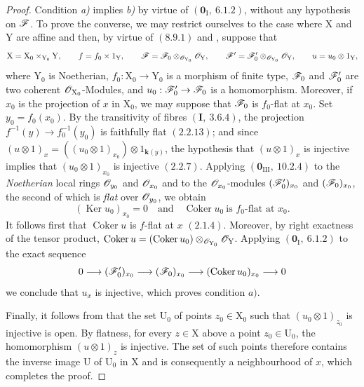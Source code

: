 \begin{proof}
Condition \emph{a)} implies \emph{b)} by virtue of $(\mathbf{0}_\mathrm{I},~6.1.2)$, without any hypothesis on $\mathscr{F}$. To prove the converse, we may restrict ourselves to the case where $\mathrm{X}$ and $\mathrm{Y}$ are affine and then, by virtue of $(8.9.1)$ and , suppose that
\[
  \mathrm{X}=\mathrm{X}_0\times_{\mathrm{Y}_0}\mathrm{Y},\qquad
  f=f_0\times 1_\mathrm{Y},\qquad
  \mathscr{F}=\mathscr{F}_0\otimes_{\mathscr{O}_{\mathrm{Y}_0}}\mathscr{O}_\mathrm{Y},\qquad
  \mathscr{F}'=\mathscr{F}'_0\otimes_{\mathscr{O}_{\mathrm{Y}_0}}\mathscr{O}_\mathrm{Y},\qquad
  u=u_0\otimes 1_\mathrm{Y},
\]
where $\mathrm{Y}_0$ is Noetherian, $f_0:\mathrm{X}_0\to\mathrm{Y}_0$ is a morphism of finite type, $\mathscr{F}_0$ and $\mathscr{F}'_0$ are two coherent $\mathscr{O}_{\mathrm{X}_0}$-Modules, and $u_0:\mathscr{F}'_0\to\mathscr{F}_0$ is a homomorphism. Moreover, if $x_0$ is the projection of $x$ in $\mathrm{X}_0$, we may suppose that $\mathscr{F}_0$ is $f_0$-flat at $x_0$. Set $y_0=f_0(x_0)$. By the transitivity of fibres $(\mathbf{I},~3.6.4)$, the projection $f^{-1}(y)\to f_0^{-1}(y_0)$ is faithfully flat $(2.2.13)$; and since $(u\otimes 1)_x=((u_0\otimes 1)_{x_0})\otimes 1_{\boldsymbol{k}(y)}$,
the hypothesis that $(u\otimes 1)_x$ is injective implies that $(u_0\otimes 1)_{x_0}$ is injective $(2.2.7)$. Applying $(\mathbf{0}_{\mathrm{III}},~10.2.4)$ to the \emph{Noetherian} local rings $\mathscr{O}_{y_0}$ and $\mathscr{O}_{x_0}$ and to the $\mathscr{O}_{x_0}$-modules $(\mathscr{F}'_0)_{x_0}$ and $(\mathscr{F}_0)_{x_0}$, the second of which is \emph{flat} over $\mathscr{O}_{y_0}$, we obtain
\[
  (\operatorname{Ker}u_0)_{x_0}=0
  \quad\text{and}\quad
  \operatorname{Coker}u_0\ \text{is $f_0$-flat at }x_0.
\]
It follows first that $\operatorname{Coker}u$ is $f$-flat at $x$ $(2.1.4)$. Moreover, by right exactness of the tensor product, $\operatorname{Coker}u=(\operatorname{Coker}u_0)
\otimes_{\mathscr{O}_{\mathrm{Y}_0}}\mathscr{O}_\mathrm{Y}$.
Applying $(\mathbf{0}_\mathrm{I},~6.1.2)$ to the exact sequence
\[
  0\longrightarrow(\mathscr{F}'_0)_{x_0}
  \longrightarrow(\mathscr{F}_0)_{x_0}
  \longrightarrow(\operatorname{Coker}u_0)_{x_0}
  \longrightarrow0
\]
we conclude that $u_x$ is injective, which proves condition $a)$.

Finally, it follows from  that the set $\mathrm{U}_0$ of points $z_0\in\mathrm{X}_0$ such that $(u_0\otimes 1)_{z_0}$ is injective is open. By flatness, for every $z\in\mathrm{X}$ above a point $z_0\in\mathrm{U}_0$, the homomorphism $(u\otimes 1)_z$ is injective. The set of such points therefore contains the inverse image $\mathrm{U}$ of $\mathrm{U}_0$ in $\mathrm{X}$ and is consequently a neighbourhood of $x$, which completes the proof.
\end{proof}

